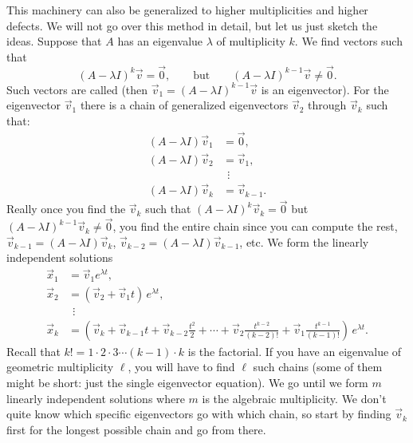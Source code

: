 This machinery can also be generalized to higher multiplicities
and higher defects.
We will not go over this method in detail, but let us just sketch the ideas.  Suppose that $A$
has an eigenvalue $\lambda$ of multiplicity $k$.
We find vectors such that
\begin{equation*}
{(A - \lambda I)}^k \vec{v} = \vec{0},
\qquad \text{but} \qquad
{(A - \lambda I)}^{k-1} \vec{v} \not= \vec{0}.
\end{equation*}
Such vectors are called \emph{} (then
$\vec{v}_1 = {(A - \lambda I)}^{k-1} \vec{v}$ is an eigenvector).
For the
eigenvector $\vec{v}_1$ there is a chain of generalized eigenvectors
$\vec{v}_2$ through $\vec{v}_k$ such that:
\begin{align*}
(A - \lambda I) \vec{v}_1 & = \vec{0} , \\
(A - \lambda I) \vec{v}_2 & = \vec{v}_1 , \\
& ~~\vdots \\
(A - \lambda I) \vec{v}_k & = \vec{v}_{k-1} .
\end{align*}
Really once you find the $\vec{v}_k$ such that
${(A - \lambda I)}^k \vec{v}_k = \vec{0}$ but
${(A - \lambda I)}^{k-1} \vec{v}_k \not= \vec{0}$, you find the entire
chain since you can compute the rest,
$\vec{v}_{k-1} = (A - \lambda I) \vec{v}_k$,
$\vec{v}_{k-2} = (A - \lambda I) \vec{v}_{k-1}$, etc.
We form the linearly independent solutions
\begin{align*}
\vec{x}_1 & = \vec{v}_1 e^{\lambda t} , \\
\vec{x}_2 & = ( \vec{v}_2 + \vec{v}_1 t ) \, e^{\lambda t} , \\
& ~~\vdots \\
\vec{x}_k & = \left( \vec{v}_k + \vec{v}_{k-1} t +
\vec{v}_{k-2} \frac{t^2}{2} +
\cdots + \vec{v}_2 \frac{t^{k-2}}{(k-2)!} + \vec{v}_1 \frac{t^{k-1}}{(k-1)!}
\right) \, e^{\lambda t} .
\end{align*}
Recall that $k! = 1 \cdot 2 \cdot 3 \cdots (k-1) \cdot k$ is the factorial.
If you have an eigenvalue of geometric multiplicity $\ell$,
you will have to find $\ell$ such chains (some of them might be
short: just the single eigenvector equation).
We go until we form $m$ linearly independent solutions where
$m$ is the algebraic multiplicity.
We don't quite know which specific eigenvectors go with which chain, so
start by finding $\vec{v}_k$ first for the longest possible chain and
go from there.

